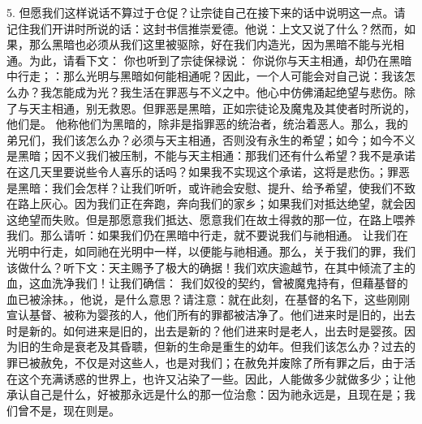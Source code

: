 5. 但愿我们这样说话不算过于仓促？让宗徒自己在接下来的话中说明这一点。请记住我们开讲时所说的话：这封书信推崇爱德。他说：上文又说了什么？然而，如果，那么黑暗也必须从我们这里被驱除，好在我们内造光，因为黑暗不能与光相通。为此，请看下文： 你也听到了宗徒保禄说： 你说你与天主相通，却仍在黑暗中行走；：那么光明与黑暗如何能相通呢？因此，一个人可能会对自己说：我该怎么办？我怎能成为光？我生活在罪恶与不义之中。他心中仿佛涌起绝望与悲伤。除了与天主相通，别无救恩。但罪恶是黑暗，正如宗徒论及魔鬼及其使者时所说的，他们是。 他称他们为黑暗的，除非是指罪恶的统治者，统治着恶人。那么，我的弟兄们，我们该怎么办？必须与天主相通，否则没有永生的希望；如今；如今不义是黑暗；因不义我们被压制，不能与天主相通：那我们还有什么希望？我不是承诺在这几天里要说些令人喜乐的话吗？如果我不实现这个承诺，这将是悲伤。；罪恶是黑暗：我们会怎样？让我们听听，或许祂会安慰、提升、给予希望，使我们不致在路上灰心。因为我们正在奔跑，奔向我们的家乡；如果我们对抵达绝望，就会因这绝望而失败。但是那愿意我们抵达、愿意我们在故土得救的那一位，在路上喂养我们。那么请听：如果我们仍在黑暗中行走，就不要说我们与祂相通。 让我们在光明中行走，如同祂在光明中一样，以便能与祂相通。那么，关于我们的罪，我们该做什么？听下文：天主赐予了极大的确据！我们欢庆逾越节，在其中倾流了主的血，这血洗净我们！让我们确信： 我们奴役的契约，曾被魔鬼持有，但藉基督的血已被涂抹。，他说，是什么意思？请注意：就在此刻，在基督的名下，这些刚刚宣认基督、被称为婴孩的人，他们所有的罪都被洁净了。他们进来时是旧的，出去时是新的。如何进来是旧的，出去是新的？他们进来时是老人，出去时是婴孩。因为旧的生命是衰老及其昏聩，但新的生命是重生的幼年。但我们该怎么办？过去的罪已被赦免，不仅是对这些人，也是对我们；在赦免并废除了所有罪之后，由于活在这个充满诱惑的世界上，也许又沾染了一些。因此，人能做多少就做多少；让他承认自己是什么，好被那永远是什么的那一位治愈：因为祂永远是，且现在是；我们曾不是，现在则是。\par

